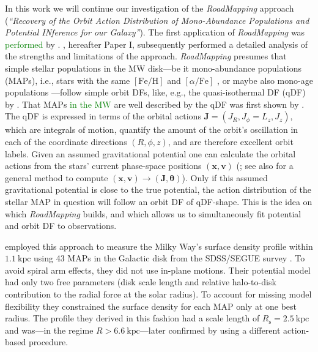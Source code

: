 \documentclass[iop,revtex4,numberedappendix,appendixfloats]{emulateapj}
\newcommand{\vect}[1]{\boldsymbol{#1}}
\newcommand{\RM}{{\sl RoadMapping}}
\newcommand{\NEW}[1]{\textcolor{Green}{#1}}
\newcommand{\OLD}[1]{}
\begin{document}
In this work we will continue our investigation of the \RM{} approach (\emph{``Recovery of the Orbit Action Distribution of Mono-Abundance Populations and Potential INference for our Galaxy''}). The first application of \RM{} was \OLD{done}\NEW{performed} by \citet{2013ApJ...779..115B}. \citet{2016ApJ...830...97T}, hereafter Paper I, subsequently performed a detailed analysis of the strengths and limitations of the approach. \RM{} presumes that simple stellar populations in the MW disk---be it mono-abundance populations (MAPs), i.e., stars with the same $[\mathrm{Fe}/\mathrm{H}]$ and $[\alpha/\mathrm{Fe}]$ \citep{2012ApJ...751..131B,2012ApJ...753..148B,2012ApJ...755..115B,2016ApJ...823...30B}, or maybe also mono-age populations \citep{2013ApJ...773...43B,2014MNRAS.442.2474M,2016MNRAS.456.3655M,2014A&A...572A..92M,2016ApJ...823..114N,2017ApJ...834...27M}---follow simple orbit DFs, like, e.g., the quasi-isothermal DF (qDF) by \citet{2011MNRAS.413.1889B}. That MAPs \NEW{in the MW} are well described by the qDF was first shown by \citet{2013MNRAS.434..652T}. The qDF is expressed in terms of the orbital actions $\vect{J}=(J_R,J_\phi=L_z,J_z)$, which are integrals of motion, quantify the amount of the orbit's oscillation in each of the coordinate directions $(R,\phi,z)$, and are therefore excellent orbit labels. Given an assumed gravitational potential one can calculate the orbital actions from the stars' current phase-space positions $(\vect{x},\vect{v})$ (\citealt{2012MNRAS.426.1324B,2016MNRAS.457.2107S}; see also \citet{2014ApJ...795...95B} for a general method to compute $(\vect{x},\vect{v})\longrightarrow(\vect{J},\vect{\theta})$). Only if this assumed gravitational potential is close to the true potential, the action distribution of the stellar MAP in question will follow an orbit DF of qDF-shape. This is the idea on which \RM{} builds, and which allows us to simultaneously fit potential and orbit DF to observations.

\citet{2013ApJ...779..115B} employed this approach to measure the Milky Way's surface density profile within $1.1~\text{kpc}$ using 43 MAPs in the Galactic disk from the SDSS/SEGUE survey \citep{2009AJ....137.4377Y}. To avoid spiral arm effects, they did not use in-plane motions. Their potential model had only two free parameters (disk scale length and relative halo-to-disk contribution to the radial force at the solar radius). To account for missing model flexibility they constrained the surface density for each MAP only at one best radius. The profile they derived in this fashion had a scale length of $R_\text{s}=2.5~\text{kpc}$ and was---in the regime $R>6.6~\text{kpc}$---later confirmed by \citet{2014MNRAS.445.3133P} using a different action-based procedure.
\end{document}
